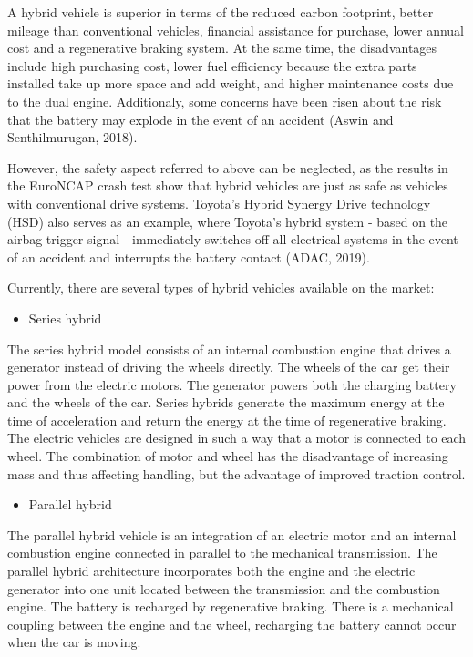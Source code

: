\documentclass[
]{book}
\providecommand{\tightlist}{%
  \setlength{\itemsep}{0pt}\setlength{\parskip}{0pt}}
\begin{document}
A hybrid vehicle is superior in terms of the reduced carbon footprint, better mileage than conventional vehicles, financial assistance for purchase, lower annual cost and a regenerative braking system. At the same time, the disadvantages include high purchasing cost, lower fuel efficiency because the extra parts installed take up more space and add weight, and higher maintenance costs due to the dual engine. Additionaly, some concerns have been risen about the risk that the battery may explode in the event of an accident (Aswin and Senthilmurugan, 2018).

However, the safety aspect referred to above can be neglected, as the results in the EuroNCAP crash test show that hybrid vehicles are just as safe as vehicles with conventional drive systems. Toyota's Hybrid Synergy Drive technology (HSD) also serves as an example, where Toyota's hybrid system - based on the airbag trigger signal - immediately switches off all electrical systems in the event of an accident and interrupts the battery contact (ADAC, 2019).

Currently, there are several types of hybrid vehicles available on the market:

\begin{itemize}
\tightlist
\item
  Series hybrid
\end{itemize}

The series hybrid model consists of an internal combustion engine that drives a generator instead of driving the wheels directly. The wheels of the car get their power from the electric motors. The generator powers both the charging battery and the wheels of the car. Series hybrids generate the maximum energy at the time of acceleration and return the energy at the time of regenerative braking. The electric vehicles are designed in such a way that a motor is connected to each wheel. The combination of motor and wheel has the disadvantage of increasing mass and thus affecting handling, but the advantage of improved traction control.

\begin{itemize}
\tightlist
\item
  Parallel hybrid
\end{itemize}

The parallel hybrid vehicle is an integration of an electric motor and an internal combustion engine connected in parallel to the mechanical transmission. The parallel hybrid architecture incorporates both the engine and the electric generator into one unit located between the transmission and the combustion engine. The battery is recharged by regenerative braking. There is a mechanical coupling between the engine and the wheel, recharging the battery cannot occur when the car is moving.
\end{document}
